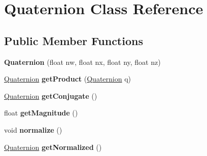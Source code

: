 \hypertarget{class_quaternion}{\section{Quaternion Class Reference}
\label{class_quaternion}
}
\subsection*{Public Member Functions}
\begin{DoxyCompactItemize}
\item 
\hypertarget{class_quaternion_ad8158a59767dc3d42ebf0324b82ba95a}{{\bfseries Quaternion} (float nw, float nx, float ny, float nz)}\label{class_quaternion_ad8158a59767dc3d42ebf0324b82ba95a}

\item 
\hypertarget{class_quaternion_a3ff8405ed92a3ca16de656e6c83b4028}{\hyperlink{class_quaternion}{Quaternion} {\bfseries get\+Product} (\hyperlink{class_quaternion}{Quaternion} q)}\label{class_quaternion_a3ff8405ed92a3ca16de656e6c83b4028}

\item 
\hypertarget{class_quaternion_a079a5673188a8a7d608e8495de0dd119}{\hyperlink{class_quaternion}{Quaternion} {\bfseries get\+Conjugate} ()}\label{class_quaternion_a079a5673188a8a7d608e8495de0dd119}

\item 
\hypertarget{class_quaternion_a6d0f82bd29fcbe29f784e848ec2eb8f1}{float {\bfseries get\+Magnitude} ()}\label{class_quaternion_a6d0f82bd29fcbe29f784e848ec2eb8f1}

\item 
\hypertarget{class_quaternion_a48e6bafb249c895ed25f29dc9170e11e}{void {\bfseries normalize} ()}\label{class_quaternion_a48e6bafb249c895ed25f29dc9170e11e}

\item 
\hypertarget{class_quaternion_a61f5f7cb9b248aa259292c3c1960a1f0}{\hyperlink{class_quaternion}{Quaternion} {\bfseries get\+Normalized} ()}\label{class_quaternion_a61f5f7cb9b248aa259292c3c1960a1f0}

\end{DoxyCompactItemize}
